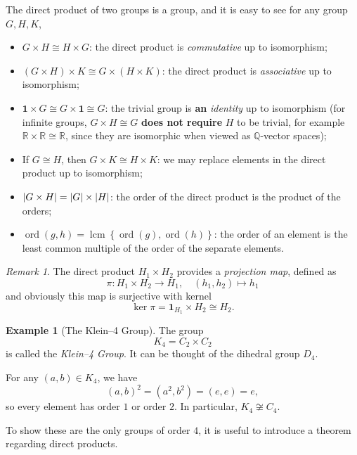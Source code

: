 \documentclass{article}
\theoremstyle{definition}
\newtheorem*{example*}{Example}
\theoremstyle{remark}
\newtheorem{remark}[theorem]{Remark}
\DeclarePairedDelimiter{\abs}{\lvert}{\rvert}
\newcommand{\pqty}[1]{\left(#1\right)}
\newcommand{\Bqty}[1]{\left\{#1\right\}}
\newcommand{\function}[5]{#1:#2\to #3,\quad #4\mapsto #5}
\newcommand{\isomorphic}{\cong}
\newcommand{\QQ}{\mathbb{Q}}
\newcommand{\RR}{\mathbb{R}}
\newcommand{\lcm}{\operatorname{lcm}}
\newcommand{\ord}{\operatorname{ord}}
\newcommand{\notisomorphic}{\not\cong}
\newcommand{\trivialgp}{\mathbf{1}}
\begin{document}
The direct product of two groups is a group, and it is easy to see for any group \(G, H, K\),
\begin{itemize}
    \item \(G \times H \isomorphic H \times G\): the direct product is \emph{commutative} up to isomorphism;
    \item \(\pqty{G \times H} \times K \isomorphic G \times \pqty{H \times K}\): the direct product is \emph{associative} up to isomorphism;
    \item \(\trivialgp \times G \isomorphic G \times \trivialgp \isomorphic G\): the trivial group is \textbf{an} \emph{identity} up to isomorphism (for infinite groups, \(G \times H \isomorphic G\) \textbf{does not require} \(H\) to be trivial, for example \(\RR \times \RR \isomorphic \RR\), since they are isomorphic when viewed as \(\QQ\)-vector spaces);
    \item If \(G \isomorphic H\), then \(G \times K \isomorphic H \times K\): we may replace elements in the direct product up to isomorphism;
    \item \(\abs{G \times H} = \abs{G} \times \abs{H}\): the order of the direct product is the product of the orders;
    \item \(\ord\pqty{g, h} = \lcm\Bqty{\ord\pqty{g}, \ord\pqty{h}}\): the order of an element is the least common multiple of the order of the separate elements.
\end{itemize}

\begin{remark}
    The direct product \(H_1 \times H_2\) provides a \emph{projection map}, defined as
    \[
        \function{\pi}{H_1 \times H_2}{H_1}{\pqty{h_1, h_2}}{h_1}
    \]
    and obviously this map is surjective with kernel
    \[
        \ker \pi = \trivialgp_{H_1} \times H_2 \isomorphic H_2.
    \]
\end{remark}

\begin{example*}[The Klein--4 Group]
    The group
    \[
        K_4 = C_2 \times C_2
    \]
    is called the \emph{Klein--4 Group}. It can be thought of the dihedral group \(D_4\).

    For any \(\pqty{a, b} \in K_4\), we have
    \[
        \pqty{a, b}^2 = \pqty{a^2, b^2} = \pqty{e, e} = e,
    \]
    so every element has order \(1\) or order \(2\). In particular, \(K_4 \notisomorphic C_4\).
\end{example*}

To show these are the only groups of order \(4\), it is useful to introduce a theorem regarding direct products.
\end{document}
